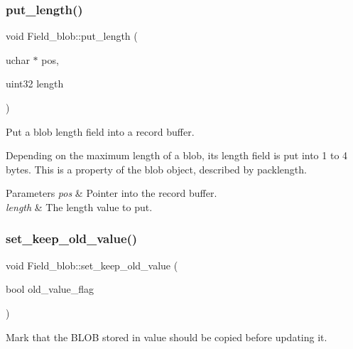 \subsubsection{\texorpdfstring{put\+\_\+length()}{put\_length()}}
{\footnotesize\ttfamily void Field\+\_\+blob\+::put\+\_\+length (\begin{DoxyParamCaption}\item[{uchar $\ast$}]{pos,  }\item[{uint32}]{length }\end{DoxyParamCaption})}

Put a blob length field into a record buffer.

Depending on the maximum length of a blob, its length field is put into 1 to 4 bytes. This is a property of the blob object, described by \textquotesingle{}packlength\textquotesingle{}.


\begin{DoxyParams}{Parameters}
{\em pos} & Pointer into the record buffer. \\
\hline
{\em length} & The length value to put. \\
\hline
\end{DoxyParams}
\mbox{\label{classField__blob_a5a73701a5ea46d5f788f4d6b32405a9b}} 
\subsubsection{\texorpdfstring{set\+\_\+keep\+\_\+old\+\_\+value()}{set\_keep\_old\_value()}}
{\footnotesize\ttfamily void Field\+\_\+blob\+::set\+\_\+keep\+\_\+old\+\_\+value (\begin{DoxyParamCaption}\item[{bool}]{old\+\_\+value\+\_\+flag }\end{DoxyParamCaption})\hspace{0.3cm}{\ttfamily [inline]}}

Mark that the B\+L\+OB stored in value should be copied before updating it.

